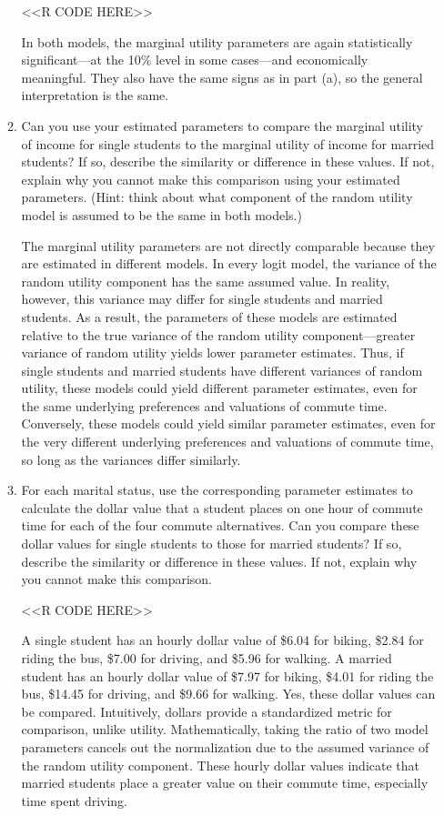 \documentclass[11pt,letterpaper]{article}
\begin{document}
\begin{enumerate}[label=\alph*., leftmargin=*]
\begin{enumerate}[label=\roman*.]
		<<R CODE HERE>>

		In both models, the marginal utility parameters are again statistically significant---at the 10\% level in some cases---and economically meaningful. They also have the same signs as in part (a), so the general interpretation is the same.

		\item Can you use your estimated parameters to compare the marginal utility of income for single students to the marginal utility of income for married students? If so, describe the similarity or difference in these values. If not, explain why you cannot make this comparison using your estimated parameters. (Hint: think about what component of the random utility model is assumed to be the same in both models.)

		The marginal utility parameters are not directly comparable because they are estimated in different models. In every logit model, the variance of the random utility component has the same assumed value. In reality, however, this variance may differ for single students and married students. As a result, the parameters of these models are estimated relative to the true variance of the random utility component---greater variance of random utility yields lower parameter estimates. Thus, if single students and married students have different variances of random utility, these models could yield different parameter estimates, even for the same underlying preferences and valuations of commute time. Conversely, these models could yield similar parameter estimates, even for the very different underlying preferences and valuations of commute time, so long as the variances differ similarly.

		\item For each marital status, use the corresponding parameter estimates to calculate the dollar value that a student places on one hour of commute time for each of the four commute alternatives. Can you compare these dollar values for single students to those for married students? If so, describe the similarity or difference in these values. If not, explain why you cannot make this comparison.

		<<R CODE HERE>>

		A single student has an hourly dollar value of \$6.04 for biking, \$2.84 for riding the bus, \$7.00 for driving, and \$5.96 for walking. A married student has an hourly dollar value of \$7.97 for biking, \$4.01 for riding the bus, \$14.45 for driving, and \$9.66 for walking. Yes, these dollar values can be compared. Intuitively, dollars provide a standardized metric for comparison, unlike utility. Mathematically, taking the ratio of two model parameters cancels out the normalization due to the assumed variance of the random utility component. These hourly dollar values indicate that married students place a greater value on their commute time, especially time spent driving. 
	\end{enumerate}


\end{enumerate}
\end{document}
